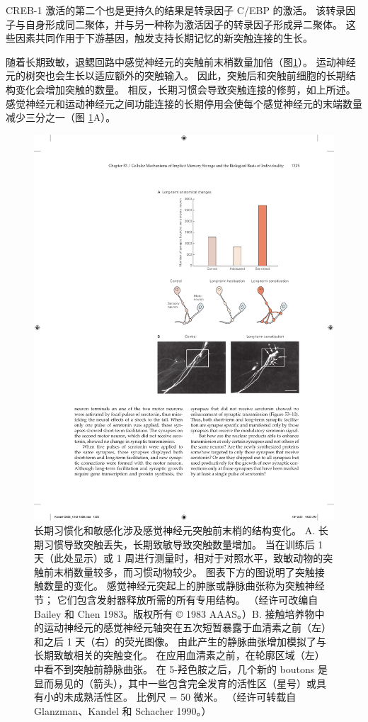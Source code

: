 CREB-1 激活的第二个也是更持久的结果是转录因子 C/EBP 的激活。
该转录因子与自身形成同二聚体，并与另一种称为激活因子的转录因子形成异二聚体。
这些因素共同作用于下游基因，触发支持长期记忆的新突触连接的生长。


随着长期致敏，退鳃回路中感觉神经元的突触前末梢数量加倍（图\ref{fig:53_9}）。
运动神经元的树突也会生长以适应额外的突触输入。 因此，突触后和突触前细胞的长期结构变化会增加突触的数量。
相反，长期习惯会导致突触连接的修剪，如上所述。
感觉神经元和运动神经元之间功能连接的长期停用会使每个感觉神经元的末端数量减少三分之一（图 \ref{fig:53_9}A）。


\begin{figure}[htbp]
	\centering
	\includegraphics[width=0.7\linewidth]{chap53/fig_53_9}
	\caption{长期习惯化和敏感化涉及感觉神经元突触前末梢的结构变化。 A. 长期习惯导致突触丢失，长期致敏导致突触数量增加。 当在训练后 1 天（此处显示）或 1 周进行测量时，相对于对照水平，致敏动物的突触前末梢数量较多，而习惯动物较少。 图表下方的图说明了突触接触数量的变化。 感觉神经元突起上的肿胀或静脉曲张称为突触神经节； 它们包含发射器释放所需的所有专用结构。 （经许可改编自 Bailey 和 Chen 1983。版权所有 © 1983 AAAS。）B. 接触培养物中的运动神经元的感觉神经元轴突在五次短暂暴露于血清素之前（左）和之后 1 天（右）的荧光图像。 由此产生的静脉曲张增加模拟了与长期致敏相关的突触变化。 在应用血清素之前，在轮廓区域（左）中看不到突触前静脉曲张。 在 5-羟色胺之后，几个新的 boutons 是显而易见的（箭头），其中一些包含完全发育的活性区（星号）或具有小的未成熟活性区。 比例尺 = 50 微米。 （经许可转载自 Glanzman、Kandel 和 Schacher 1990。）}
	\label{fig:53_9}
\end{figure}




